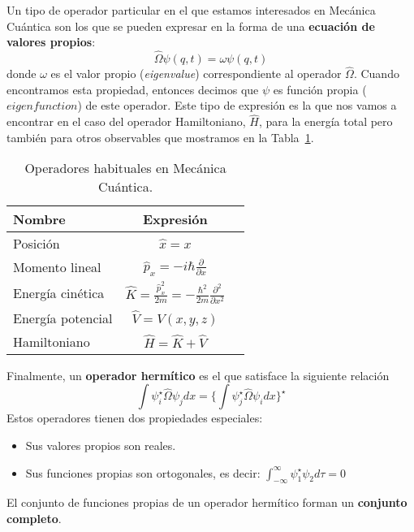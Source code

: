 Un tipo de operador particular en el que estamos 
interesados en Mecánica Cuántica son los que se pueden
expresar en la forma de una \textbf{ecuación de valores
propios}:
\begin{equation}
    \hat{\Omega}\psi(q,t)=\omega\psi(q,t)
\end{equation}
donde $\omega$ es el valor propio (\textit{eigenvalue})
correspondiente al operador $\hat{\Omega}$. Cuando
encontramos esta propiedad, entonces decimos que $\psi$ 
es función propia ($\textit{eigenfunction}$) de este
operador. Este tipo de expresión es la que nos vamos a
encontrar en el caso del operador Hamiltoniano, 
$\hat{H}$, para la energía total pero también para 
otros observables que mostramos en la 
Tabla~\ref{tab:operators}.

\begin{table}[h]
  \begin{center}
    \small
    \begin{tabular}{lcr}
      \toprule
      Nombre & Expresión \\
      \midrule
      Posición & $\hat{x}=x$ \\
      Momento lineal & $\hat{p}_x=-i\hbar \frac{\partial}{\partial x}$ \\
      Energía cinética & $\hat{K}=\frac{\hat{p}_x^2}{2m}=
      -\frac{\hbar^2}{2m}\frac{\partial^2}{\partial x^2}$\\
      Energía potencial & $\hat{V}=V(x,y,z)$ \\
      Hamiltoniano & $\hat{H}=\hat{K}+\hat{V}$ \\
      \bottomrule
    \end{tabular}
  \end{center}
  \caption{Operadores habituales en Mecánica Cuántica.}
  \label{tab:operators}
\end{table}

Finalmente, un \textbf{operador hermítico} es el que
satisface la siguiente relación
\begin{equation}
    \int\psi_i^\star\hat{\Omega}\psi_jdx=
    \bigg\{\int\psi_j^\star\hat{\Omega}\psi_idx\bigg\}^\star
\end{equation}
Estos operadores tienen dos propiedades especiales:
\begin{itemize}
    \item Sus valores propios son reales.
    \item Sus funciones propias son ortogonales, es decir:
    $\int_{-\infty}^\infty\psi_1^\star\psi_2d\tau=0$
\end{itemize}
El conjunto de funciones propias de un operador 
    hermítico forman un \textbf{conjunto completo}.

